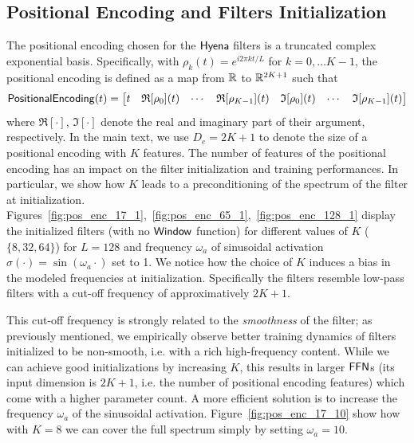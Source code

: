 \subsection{Positional Encoding and Filters Initialization}\label{app:posemb}
%
The positional encoding chosen for the $\sf Hyena$ filters is a truncated complex exponential basis. Specifically, with $\rho_k(t) = e^{i2\pi kt/L}$ for $k=0,\dots K-1$, the positional encoding is defined as a map from $\mathbb{R}$ to $\mathbb{R}^{2K+1}$ such that
%
\[
    {\sf PositionalEncoding}(t) = 
    \begin{bmatrix}
        t&
        \mathfrak{R}[\rho_0](t)&
        \cdots&
        \mathfrak{R}[\rho_{K-1}](t)&
        \mathfrak{I}[\rho_0](t)&
        \cdots&
        \mathfrak{I}[\rho_{K-1}](t)
    \end{bmatrix}
\]
%
where $\mathfrak{R}[\cdot]$, $\mathfrak{I}[\cdot]$ denote the real and imaginary part of their argument, respectively. In the main text, we use $D_e = 2K + 1$ to denote the size of a positional encoding with $K$ features. The number of features of the positional encoding has an impact on the filter initialization and training performances. In particular, we show how $K$ leads to a preconditioning of the spectrum of the filter at initialization. Figures~\ref{fig:pos_enc_17_1},~\ref{fig:pos_enc_65_1},~\ref{fig:pos_enc_128_1} display the initialized filters (with no $\sf Window$ function) for different values of $K$ ($\{8, 32, 64\}$) for $L=128$ and frequency $\omega_a$ of sinusoidal activation $\sigma(\cdot) = \sin(\omega_a \cdot)$ set to 1. We notice how the choice of $K$ induces a bias in the modeled frequencies at initialization. Specifically the filters resemble low-pass filters with a cut-off frequency of approximatively $2K + 1$. 

This cut-off frequency is strongly related to the \textit{smoothness} of the filter; as previously mentioned, we empirically observe better training dynamics of filters initialized to be non-smooth, i.e. with a rich high-frequency content. While we can achieve good initializations by increasing $K$, this results in larger $\sf FFN$s (its input dimension is $2K + 1$, i.e. the number of positional encoding features) which come with a higher parameter count. A more efficient solution is to increase the frequency $\omega_a$ of the sinusoidal activation. Figure~\ref{fig:pos_enc_17_10} show how with $K=8$ we can cover the full spectrum simply by setting $\omega_a=10$. 

